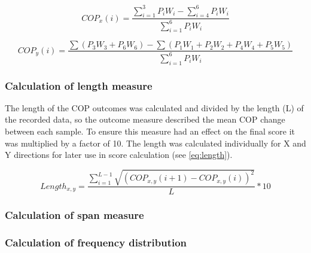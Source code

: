 \begin{equation}
COP_x(i) =  \frac{\sum_{i=1}^{3}P_i W_i - \sum_{i=4}^{6}P_i W_i}{\sum_{i=1}^{6}P_i W_i}
\end{equation} \label{eq:COPx}

\begin{equation}
COP_y(i) =  \frac{\sum(P_3 W_3 + P_6 W_6) - \sum(P_1 W_1+P_2 W_2+P_4 W_4+P_5 W_5)}{\sum_{i=1}^{6}P_i W_i}
\end{equation} \label{eq:COPy}




\subsubsection{Calculation of length measure}
The length of the COP outcomes was calculated and divided by the length (L) of the recorded data, so the outcome measure described the mean COP change between each sample. To ensure this measure had an effect on the final score it was multiplied by a factor of 10. The length was calculated individually for X and Y directions for later use in score calculation (see \eqref{eq:length}).

\begin{equation}
	Length_{x,y} = \frac{\sum_{i=1}^{L-1}\sqrt{(COP_{x,y} (i+1)-COP_{x,y} (i))^2}}{L} * 10
\end{equation}




\subsubsection{Calculation of span measure}





\subsubsection{Calculation of frequency distribution}




